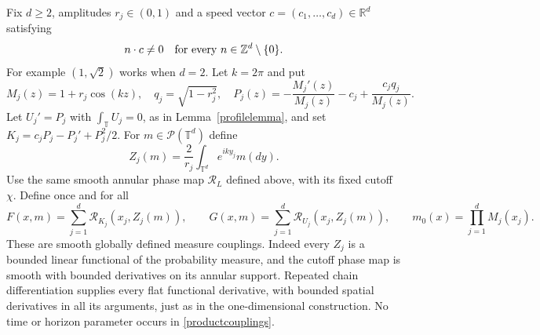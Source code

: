 \documentclass[11pt]{article}
\newcommand{\R}{\mathbb R}
\newcommand{\Z}{\mathbb Z}
\newcommand{\T}{\mathbb T}
\begin{document}
Fix $d\geq2$, amplitudes $r_j\in(0,1)$ and a speed vector
$c=(c_1,\ldots,c_d)\in\R^d$ satisfying
\begin{equation}\label{rationalindependent}
 n\cdot c\ne0\quad\hbox{for every }n\in\Z^d\setminus\{0\}.
\end{equation}
For example $(1,\sqrt2)$ works when $d=2$. Let $k=2\pi$ and put
\[
 M_j(z)=1+r_j\cos(kz),\quad q_j=\sqrt{1-r_j^2},\quad
 P_j(z)=-\frac{M_j'(z)}{M_j(z)}-c_j+\frac{c_jq_j}{M_j(z)}.
\]
Let $U_j'=P_j$ with $\int_\T U_j=0$, as in
Lemma~\ref{profilelemma}, and set
$K_j=c_jP_j-P_j'+P_j^2/2$. For $m\in\mathcal P(\T^d)$ define
\[
 Z_j(m)=\frac2{r_j}\int_{\T^d}e^{iky_j}m(dy).
\]
Use the same smooth annular phase map $\mathcal R_L$ defined above,
with its fixed cutoff $\chi$. Define once and for all
\begin{equation}\label{productcouplings}
 F(x,m)=\sum_{j=1}^d\mathcal R_{K_j}(x_j,Z_j(m)),\qquad
 G(x,m)=\sum_{j=1}^d\mathcal R_{U_j}(x_j,Z_j(m)),\qquad
 m_0(x)=\prod_{j=1}^dM_j(x_j).
\end{equation}
These are smooth globally defined measure couplings. Indeed every $Z_j$
is a bounded linear functional of the probability measure, and the
cutoff phase map is smooth with bounded derivatives on its annular
support. Repeated chain differentiation supplies every flat functional
derivative, with bounded spatial derivatives in all its arguments, just
as in the one-dimensional construction. No time or horizon parameter
occurs in \eqref{productcouplings}.
\end{document}
